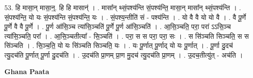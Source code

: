 \documentclass[17pt]{extarticle}
\begin{document}
53. हि मासा॒न् मासा॒न्॒. हि हि मासान्॑ । . मासा᳚न् थ्सं॒पश्य॑न्ति सं॒पश्य॑न्ति॒ मासा॒न् मासा᳚न् थ्सं॒पश्य॑न्ति । . सं॒पश्य॑न्ति॒ यो यः सं॒पश्य॑न्ति सं॒पश्य॑न्ति॒ यः । . सं॒पश्य॒न्तीति॑ सं - पश्य॑न्ति । . यो वै वै यो यो वै । . वै पू॒र्णे पू॒र्णे वै वै पू॒र्णे । . पू॒र्ण आ॑सि॒ञ्च त्या॑सि॒ञ्चति॑ पू॒र्णे पू॒र्ण आ॑सि॒ञ्चति॑ । . आ॒सि॒ञ्चति॒ परा॒ परा॑ ऽऽसि॒ञ्च त्या॑सि॒ञ्चति॒ परा᳚ । . आ॒सि॒ञ्चतीत्या᳚ - सि॒ञ्चति॑ । . परा॒ स स परा॒ परा॒ सः । . स सि॑ञ्चति सिञ्चति॒ स स सि॑ञ्चति । . सि॒ञ्च॒ति॒ यो यः सि॑ञ्चति सिञ्चति॒ यः । . यः पू॒र्णात् पू॒र्णाद् यो यः पू॒र्णात् । . पू॒र्णा दु॒दच॑ त्यु॒दच॑ति पू॒र्णात् पू॒र्णा दु॒दच॑ति । . उ॒दच॑ति प्रा॒णम् प्रा॒ण मु॒दच॑ त्यु॒दच॑ति प्रा॒णम् । . उ॒दच॒तीत्यु॑त् - अच॑ति । \newline

\textbf{Ghana Paata } \newline
\end{document}

